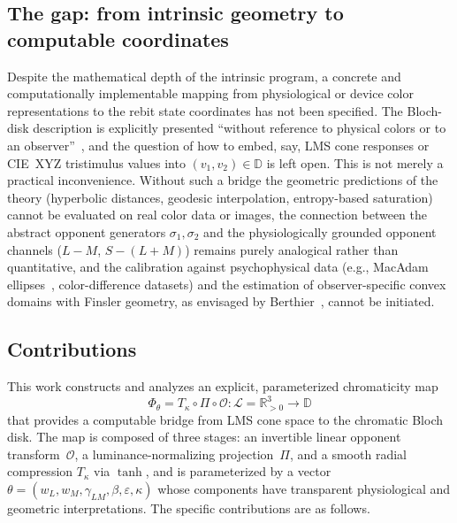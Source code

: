 \documentclass[11pt]{article}
\theoremstyle{plain}
\theoremstyle{definition}
\theoremstyle{remark}
\begin{document}
\subsection{The gap: from intrinsic geometry to computable coordinates}
\label{ssec:gap}

Despite the mathematical depth of the intrinsic program, a concrete and computationally implementable mapping from physiological or device color representations to the rebit state coordinates has not been specified.
The Bloch-disk description is explicitly presented ``without reference to physical colors or to an observer''~\cite{Berthier2020}, and the question of how to embed, say, LMS cone responses or CIE~XYZ tristimulus values into $(v_1, v_2) \in \mathbb{D}$ is left open.
This is not merely a practical inconvenience.
Without such a bridge the geometric predictions of the theory (hyperbolic distances, geodesic interpolation, entropy-based saturation) cannot be evaluated on real color data or images, the connection between the abstract opponent generators $\sigma_1, \sigma_2$ and the physiologically grounded opponent channels ($L{-}M$, $S{-}(L{+}M)$) remains purely analogical rather than quantitative, and the calibration against psychophysical data (e.g., MacAdam ellipses~\cite{MacAdam1942}, color-difference datasets) and the estimation of observer-specific convex domains with Finsler geometry, as envisaged by Berthier~\cite{Berthier2020}, cannot be initiated.

\subsection{Contributions}
\label{ssec:contributions}

This work constructs and analyzes an explicit, parameterized chromaticity map
\[
\Phi_\theta = T_\kappa \circ \Pi \circ \mathcal{O} \colon \mathcal{L} = \mathbb{R}_{>0}^3 \longrightarrow \mathbb{D}
\]
that provides a computable bridge from LMS cone space to the chromatic Bloch disk.
The map is composed of three stages: an invertible linear opponent transform~$\mathcal{O}$, a luminance-normalizing projection~$\Pi$, and a smooth radial compression $T_\kappa$ via $\tanh$, and is parameterized by a vector $\theta = (w_L, w_M, \gamma_{LM}, \beta, \varepsilon, \kappa)$ whose components have transparent physiological and geometric interpretations. The specific contributions are as follows.
\end{document}

